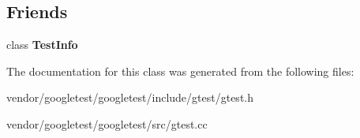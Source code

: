 \subsection*{Friends}
\begin{DoxyCompactItemize}
\item 
\mbox{\label{classtesting_1_1_test_a4c49c2cdb6c328e6b709b4542f23de3c}} 
class {\bfseries Test\+Info}
\end{DoxyCompactItemize}


The documentation for this class was generated from the following files\+:\begin{DoxyCompactItemize}
\item 
vendor/googletest/googletest/include/gtest/gtest.\+h\item 
vendor/googletest/googletest/src/gtest.\+cc\end{DoxyCompactItemize}
